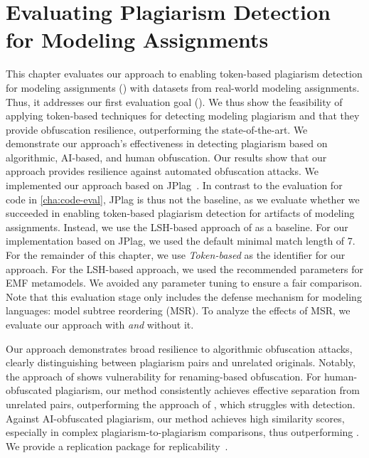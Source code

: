\chapter[Evaluating Modeling Plagiarism]{Evaluating Plagiarism Detection for Modeling Assignments}\label{sec:mde-eval}

This chapter evaluates our approach to enabling token-based plagiarism detection for modeling assignments () with datasets from real-world modeling assignments. Thus, it addresses our first evaluation goal ().
We thus show the feasibility of applying token-based techniques for detecting modeling plagiarism and that they provide obfuscation resilience, outperforming the state-of-the-art.
We demonstrate our approach's effectiveness in detecting plagiarism based on algorithmic, AI-based, and human obfuscation.
Our results show that our approach provides resilience against automated obfuscation attacks.
%
We implemented our approach based on JPlag~\cite{prechelt2002}. In contrast to the evaluation for code in \autoref{cha:code-eval}, JPlag is thus not the baseline, as we evaluate whether we succeeded in enabling token-based plagiarism detection for artifacts of modeling assignments.
Instead, we use the LSH-based approach of \citet{Martinez2020} as a baseline.
For our implementation based on JPlag, we used the default minimal match length of 7.
For the remainder of this chapter, we use \textit{Token-based} as the identifier for our approach.
For the LSH-based approach, we used the recommended parameters for \ac{EMF} metamodels.
We avoided any parameter tuning to ensure a fair comparison.
%
Note that this evaluation stage only includes the defense mechanism for modeling languages: model subtree reordering (MSR).
To analyze the effects of MSR, we evaluate our approach with \textit{and} without it.

Our approach demonstrates broad resilience to algorithmic obfuscation attacks, clearly distinguishing between plagiarism pairs and unrelated originals. Notably, the approach of \citet{Martinez2020} shows vulnerability for renaming-based obfuscation. For human-obfuscated plagiarism, our method consistently achieves effective separation from unrelated pairs, outperforming the approach of \citet{Martinez2020}, which struggles with detection. Against AI-obfuscated plagiarism, our method achieves high similarity scores, especially in complex plagiarism-to-plagiarism comparisons, thus outperforming \citet{Martinez2020}. We provide a replication package for replicability~.

